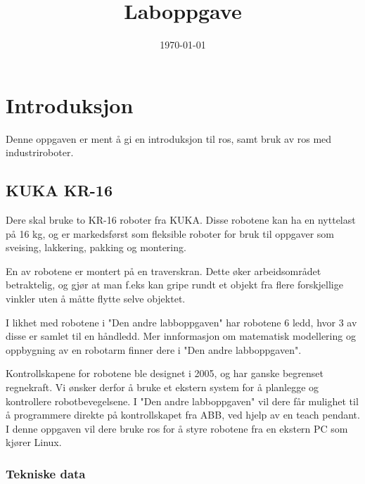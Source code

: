 \documentclass{article}
\title{Laboppgave}
\date{\today}
\begin{document}


\maketitle

\section{Introduksjon}
Denne oppgaven er ment å gi en introduksjon til \gls{ros}, samt bruk av \gls{ros} med industriroboter. 


\subsection{KUKA KR-16}
Dere skal bruke to KR-16 roboter fra KUKA. Disse robotene kan ha en nyttelast på 16 kg, og er markedsførst som fleksible roboter for bruk til oppgaver som sveising, lakkering, pakking og montering.

En av robotene er montert på en traverskran. Dette øker arbeidsområdet betraktelig, og gjør at man f.eks kan gripe rundt et objekt fra flere forskjellige vinkler uten å måtte flytte selve objektet.  

I likhet med robotene i "Den andre labboppgaven" har robotene 6 ledd, hvor 3 av disse er samlet til en håndledd. Mer innformasjon om matematisk modellering og oppbygning av en robotarm finner dere i "Den andre labboppgaven".


Kontrollskapene for robotene ble designet i 2005, og har ganske begrenset regnekraft. Vi ønsker derfor å bruke et ekstern system for å planlegge og kontrollere robotbevegelsene. I "Den andre labboppgaven" vil dere får mulighet til å programmere direkte på kontrollskapet fra ABB, ved hjelp av en teach pendant. I denne oppgaven vil dere bruke \gls{ros} for å styre robotene fra en ekstern PC som kjører Linux. 

\subsubsection{Tekniske data}
\end{document}
